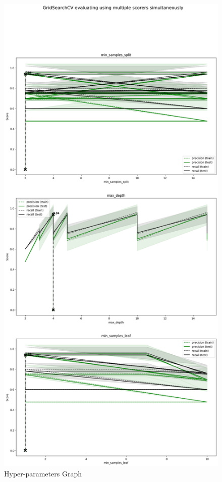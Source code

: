 \documentclass{article}
\begin{document}
\begin{figure}[H]
\centering
\includegraphics[height=0.9\textheight]{img/Q3/hyper}
\caption{Hyper-parameters Graph}
\label{fig:Q3 hyper}
\end{figure}
\end{document}
